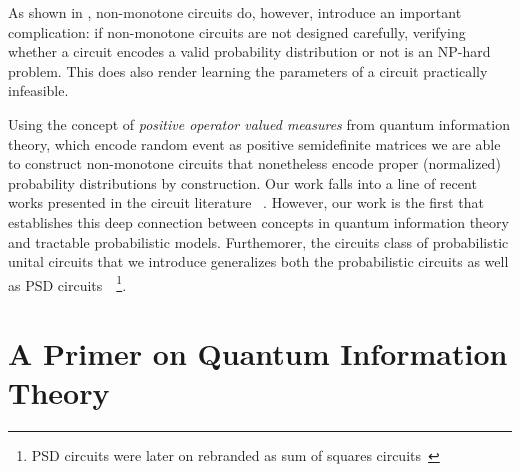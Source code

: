 As shown in \citep{harviainen2023inference,agarwalprobabilistic}, non-monotone circuits do, however, introduce an important complication: if non-monotone circuits are not designed carefully, verifying whether a circuit encodes a valid probability distribution or not is an NP-hard problem. This does also render learning the parameters of a circuit practically infeasible.

Using the concept of \textit{positive operator valued measures} from quantum information theory, which encode random event as positive semidefinite matrices we are able to construct non-monotone circuits that nonetheless encode proper (normalized) probability distributions by construction.
Our work falls into a line of recent works presented in the circuit literature ~\citep{sladek2023encoding,loconte2024subtractive,wangrelationship,loconte2024sum}. However, our work is the first that establishes this deep connection between concepts in quantum information theory and tractable probabilistic models.
Furthemorer, the circuits class of probabilistic unital circuits that we introduce generalizes both the probabilistic circuits as well as PSD circuits~~\citep{sladek2023encoding,loconte2024subtractive,loconte2024sum}\citep{sladek2023encoding}\footnote{PSD circuits were later on rebranded as sum of squares circuits~\citep{loconte2024sum}}.











\section{A Primer on Quantum Information Theory}
\label{sec:qit}


